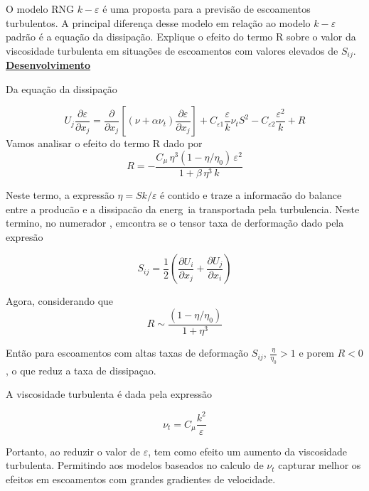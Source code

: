 \documentclass[12pt]{article}
\begin{document}
O modelo RNG $k-\varepsilon$ é uma proposta para a previsão de escoamentos turbulentos. A principal diferença desse modelo em relação ao modelo $k-\varepsilon$ padrão é a equação da dissipação. Explique o efeito do termo R sobre o valor da viscosidade turbulenta em situações de
escoamentos com valores elevados de $S_{ij}$.\\

\textbf{\underline{Desenvolvimento}}

Da equação da dissipação

\begin{equation}
	U_j \frac{\partial \varepsilon}{\partial x_j} = 
	\frac{\partial}{\partial x_j} \left[ \left( \nu + \alpha \nu_t \right) \frac{\partial \varepsilon}{\partial x_j} \right]
	+ C_{\varepsilon 1} \frac{\varepsilon}{k} \nu_t S^2 
	- C_{\varepsilon 2} \frac{\varepsilon^2}{k} + R
\end{equation}
 Vamos analisar o efeito do termo R dado por 
\begin{equation}
	R = - \frac{C_\mu \, \eta^3 \left(1 - \eta / \eta_0 \right) \, \varepsilon^2}{1 + \beta \, \eta^3 \, k}
\end{equation}

Neste termo, a expressão $\eta = Sk/\varepsilon$ é contido e traze a informacão do balance entre a producão e a dissipacão da energ~ia transportada pela turbulencia. Neste termino, no numerador , emcontra se o tensor taxa de derformação dado pela expresão

\begin{equation}
	S_{ij} = \frac{1}{2} \left( \frac{\partial U_i}{\partial x_j} + \frac{\partial U_j}{\partial x_i} \right)
\end{equation}

Agora, considerando que
\begin{equation}
	R \sim  \frac{\left(1 - \eta / \eta_0 \right) }{1 +  \eta^3}
\end{equation}

Então para escoamentos com altas taxas de deformação $S_{ij}$, $\frac{\eta}{\eta_0} > 1$ e porem $R<0$, o que reduz a taxa de dissipaçao.

A viscosidade turbulenta é dada pela expressão

\begin{equation}
	\nu_t = C_\mu \frac{k^2}{\varepsilon}
\end{equation}

Portanto, ao reduzir o valor de $\varepsilon$, tem como efeito um aumento da viscosidade turbulenta. Permitindo aos modelos baseados no calculo de  $\nu_t$ capturar melhor os efeitos em escoamentos com grandes gradientes de velocidade.
\end{document}
